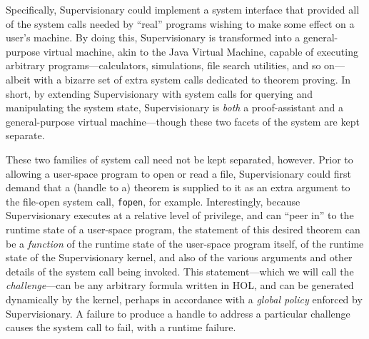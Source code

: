 \documentclass[a4paper, UKenglish, cleveref, autoref, thm-restate, colorlinks]{lipics-v2021}
\begin{document}
Specifically, Supervisionary could implement a system interface that provided all of the system calls needed by ``real'' programs wishing to make some effect on a user's machine.
By doing this, Supervisionary is transformed into a general-purpose virtual machine, akin to the Java Virtual Machine, capable of executing arbitrary programs---calculators, simulations, file search utilities, and so on---albeit with a bizarre set of extra system calls dedicated to theorem proving.
In short, by extending Supervisionary with system calls for querying and manipulating the system state, Supervisionary is \emph{both} a proof-assistant and a general-purpose virtual machine---though these two facets of the system are kept separate.

These two families of system call need not be kept separated, however.
Prior to allowing a user-space program to open or read a file, Supervisionary could first demand that a (handle to a) theorem is supplied to it as an extra argument to the file-open system call, \texttt{fopen}, for example.
Interestingly, because Supervisionary executes at a relative level of privilege, and can ``peer in'' to the runtime state of a user-space program, the statement of this desired theorem can be a \emph{function} of the runtime state of the user-space program itself, of the runtime state of the Supervisionary kernel, and also of the various arguments and other details of the system call being invoked.
This statement---which we will call the \emph{challenge}---can be any arbitrary formula written in HOL, and can be generated dynamically by the kernel, perhaps in accordance with a \emph{global policy} enforced by Supervisionary.
A failure to produce a handle to address a particular challenge causes the system call to fail, with a runtime failure.
\end{document}
